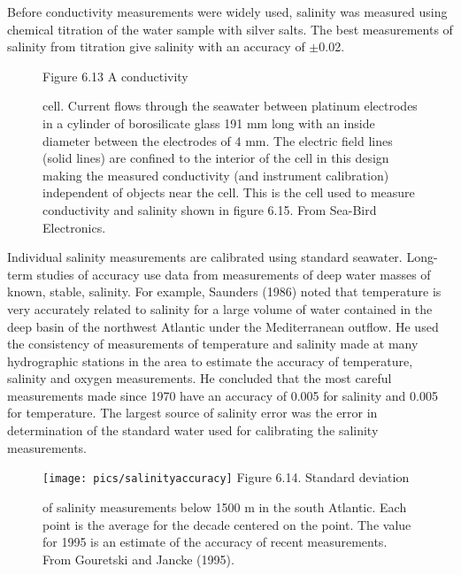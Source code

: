 Before conductivity measurements were widely used, salinity
was measured using chemical titration
of the water sample with silver salts. The best measurements of
salinity from titration give salinity with an
accuracy of $\pm$0.02.

\begin{figure}[t!]
\footnotesize
Figure 6.13 A conductivity \rule{0pt}{4ex}cell. Current flows through
the seawater between platinum electrodes in a cylinder of borosilicate
glass 191 mm long with an inside diameter between the electrodes of 4
mm. The electric field lines (solid lines) are confined to the
interior of the cell in this design making the measured conductivity
(and instrument calibration) independent of objects near the
cell. This is the cell used to measure conductivity and salinity shown
in figure 6.15. From Sea-Bird Electronics.
\label{fig:conductivity}
\vspace{-3ex}
\end{figure}

Individual salinity measurements are
calibrated using standard seawater. Long-term studies of
accuracy use data from measurements of deep
water masses of known, stable, salinity. For example, Saunders (1986)
noted that temperature is very accurately related to salinity for a
large volume of water contained in the deep basin of the northwest
Atlantic under the Mediterranean outflow. He used the consistency of
measurements of temperature and salinity made at many hydrographic
stations in the area to
estimate the accuracy of temperature,
salinity and oxygen measurements. He concluded that the most careful
measurements made since 1970 have an accuracy of 0.005 for salinity
and 0.005 for temperature. The largest source of salinity
error was the error in determination of the standard water used for
calibrating the salinity measurements.

\begin{figure}[t!]
\texttt{[image: pics/salinityaccuracy]}
\footnotesize
Figure 6.14. Standard deviation \rule{0mm}{3ex}of salinity
measurements below 1500 m in the south Atlantic. Each point is the
average for the decade centered on the point. The value for 1995 is an
estimate of the accuracy of recent
measurements. From Gouretski and Jancke (1995).
\label{fig:salinityaccuracy}
\vspace{-4ex}
\end{figure}

